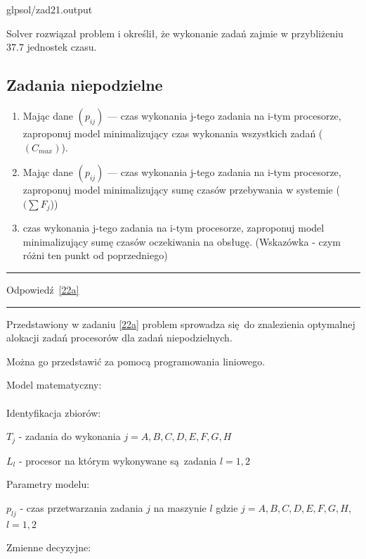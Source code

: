 \documentclass{article}
\begin{document}

{glpsol/zad21.output}

Solver rozwiązał problem i określił, że wykonanie zadań zajmie w przybliżeniu $37.7$ jednostek czasu.

\subsection{Zadania niepodzielne}
\begin{enumerate}[label=(\alph*)]
    \item \label{22a} Mając dane $(p_{ij})$ — czas wykonania j-tego zadania na i-tym procesorze,
          zaproponuj model minimalizujący czas wykonania wszystkich
          zadań ($(C_{max})$).
    \item \label{22b} Mając dane $(p_{ij})$ — czas wykonania j-tego zadania na i-tym procesorze,
          zaproponuj model minimalizujący sumę czasów przebywania w
          systemie ($(\sum F_j$))
    \item \label{22c} czas wykonania j-tego zadania na i-tym procesorze,
          zaproponuj model minimalizujący sumę czasów oczekiwania na obsługę.
          (Wskazówka - czym różni ten punkt od poprzedniego)
\end{enumerate}

\par\noindent\rule{\textwidth}{0.4pt}
Odpowiedź \ref{22a}
\par\noindent\rule{\textwidth}{0.4pt}

Przedstawiony w zadaniu \ref{22a} problem sprowadza się do znalezienia optymalnej alokacji zadań procesorów dla zadań niepodzielnych.

Można go przedstawić za pomocą programowania liniowego.

\noindent Model matematyczny: \\\\

\noindent Identyfikacja zbiorów:

$T_j$ - zadania do wykonania $j = {A,B,C,D,E,F,G,H}$

$L_{l}$ - procesor na którym wykonywane są zadania $l = {1,2}$

\noindent Parametry modelu:

$p_{lj}$ - czas przetwarzania zadania $j$ na maszynie $l$ gdzie $j = {A,B,C,D,E,F,G,H}$, $l = {1,2}$

\noindent Zmienne decyzyjne:
\end{document}
